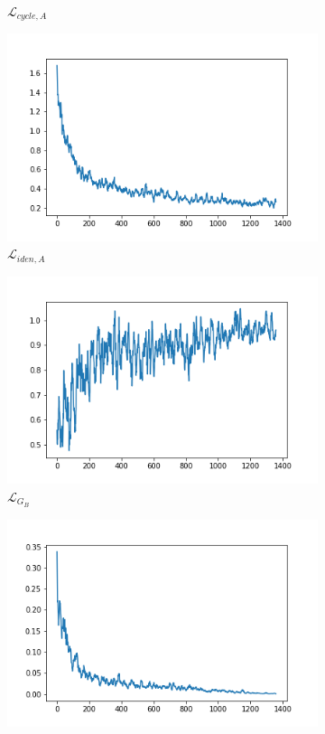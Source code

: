 \documentclass{beamer}
\begin{document}
\begin{frame}
\begin{figure}[htb]
\begin{subfigure}[b]{0.23\linewidth}
        \caption{$\mathcal{L}_{cycle,A}$}
      \end{subfigure}
      \begin{subfigure}[b]{0.23\linewidth}
        \includegraphics[width=\linewidth]{exp4_idt_A.png}
        \caption{$\mathcal{L}_{iden,A}$}
      \end{subfigure}
      \begin{subfigure}[b]{0.23\linewidth}
        \includegraphics[width=\linewidth]{exp4_G_B.png}
        \caption{$\mathcal{L}_{G_B}$}
      \end{subfigure}
      \begin{subfigure}[b]{0.23\linewidth}
        \includegraphics[width=\linewidth]{exp4_D_B.png}

\end{subfigure}
\end{figure}
\end{frame}
\end{document}
